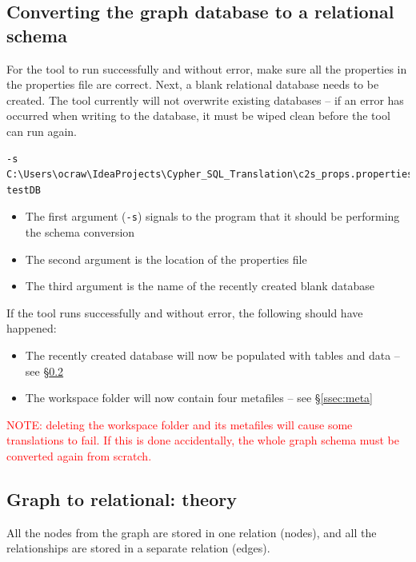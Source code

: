 \documentclass[letterpaper]{ltxdoc}
\begin{document}
\subsection{Converting the graph database to a relational schema}
For the tool to run successfully and without error, make sure all the properties in the properties file are correct. Next, a blank relational database needs to be created. The tool currently will not overwrite existing databases -- if an error has occurred when writing to the database, it must be wiped clean before the tool can run again.

\medskip

\begin{verbatim}
-s C:\Users\ocraw\IdeaProjects\Cypher_SQL_Translation\c2s_props.properties testDB
\end{verbatim}

\medskip

\begin{itemize}
\item The first argument (\texttt{-s}) signals to the program that it should be performing the schema conversion
\item The second argument is the location of the properties file
\item The third argument is the name of the recently created blank database
\end{itemize}

\medskip

If the tool runs successfully and without error, the following should have happened:

\begin{itemize}
\item The recently created database will now be populated with tables and data -- see \S \ref{ssec:grreltheory}
\item The workspace folder will now contain four metafiles -- see \S \ref{ssec:meta}
\end{itemize}

\medskip

\textcolor{red}{NOTE: deleting the workspace folder and its metafiles will cause some translations to fail. If this is done accidentally, the whole graph schema must be converted again from scratch.}


\subsection{Graph to relational: theory}
\label{ssec:grreltheory}
All the nodes from the graph are stored in one relation (nodes), and all the relationships are stored in a separate relation (edges).
\end{document}
